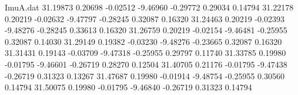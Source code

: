 \begin{filecontents}{ImuA.dat}
  31.19873    0.20698   -0.02512   -9.46960   -0.29772    0.29034    0.14794
  31.22178    0.20219   -0.02632   -9.47797   -0.28245    0.32087    0.16320
  31.24463    0.20219   -0.02393   -9.48276   -0.28245    0.33613    0.16320
  31.26759    0.20219   -0.02154   -9.46481   -0.25955    0.32087    0.14030
  31.29149    0.19382   -0.03230   -9.48276   -0.23665    0.32087    0.16320
  31.31431    0.19143   -0.03709   -9.47318   -0.25955    0.29797    0.11740
  31.33785    0.19980   -0.01795   -9.46601   -0.26719    0.28270    0.12504
  31.40705    0.21176   -0.01795   -9.47438   -0.26719    0.31323    0.13267
  31.47687    0.19980   -0.01914   -9.48754   -0.25955    0.30560    0.14794
  31.50075    0.19980   -0.01795   -9.46840   -0.26719    0.31323    0.14794
\end{filecontents}
